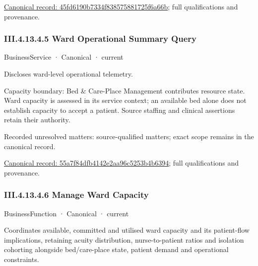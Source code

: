{\footnotesize \href{../../../../../../../../continuum/business/business-function/45fd6190b7334f838575881725f6a66b.md}{Canonical record: 45fd6190b7334f838575881725f6a66b}; full qualifications and provenance.}\par
\subsubsection*{III.4.13.4.5 Ward Operational Summary Query}
\label{navigation:III.4.13.4.5}

\label{element:55a7f84dfb4142e2aa96c5253b4b6394}
{\small BusinessService · Canonical · current}\par

Discloses ward-level operational telemetry.



Capacity boundary: Bed \& Care-Place Management contributes resource state. Ward capacity is assessed in its service context; an available bed alone does not establish capacity to accept a patient. Source staffing and clinical assertions retain their authority.


{\small Recorded unresolved matters: source-qualified matters; exact scope remains in the canonical record.}\par
{\footnotesize \href{../../../../../../../../continuum/business/business-service/55a7f84dfb4142e2aa96c5253b4b6394.md}{Canonical record: 55a7f84dfb4142e2aa96c5253b4b6394}; full qualifications and provenance.}\par
\subsubsection*{III.4.13.4.6 Manage Ward Capacity}
\label{navigation:III.4.13.4.6}

\label{element:eca5f4fbf92743f987a01930dc4ee763}
{\small BusinessFunction · Canonical · current}\par

Coordinates available, committed and utilised ward capacity and its patient-flow implications, retaining acuity distribution, nurse-to-patient ratios and isolation cohorting alongside bed/care-place state, patient demand and operational constraints.



